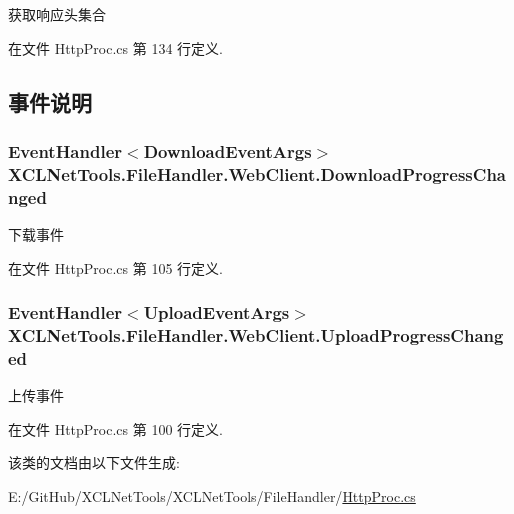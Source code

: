 获取响应头集合 



在文件 Http\+Proc.\+cs 第 134 行定义.



\subsection{事件说明}
\subsubsection[{\texorpdfstring{Download\+Progress\+Changed}{DownloadProgressChanged}}]{\setlength{\rightskip}{0pt plus 5cm}Event\+Handler$<${\bf Download\+Event\+Args}$>$ X\+C\+L\+Net\+Tools.\+File\+Handler.\+Web\+Client.\+Download\+Progress\+Changed}\hypertarget{class_x_c_l_net_tools_1_1_file_handler_1_1_web_client_aa1e50d608381b728356547eff9f80213}{}\label{class_x_c_l_net_tools_1_1_file_handler_1_1_web_client_aa1e50d608381b728356547eff9f80213}


下载事件 



在文件 Http\+Proc.\+cs 第 105 行定义.

\subsubsection[{\texorpdfstring{Upload\+Progress\+Changed}{UploadProgressChanged}}]{\setlength{\rightskip}{0pt plus 5cm}Event\+Handler$<${\bf Upload\+Event\+Args}$>$ X\+C\+L\+Net\+Tools.\+File\+Handler.\+Web\+Client.\+Upload\+Progress\+Changed}\hypertarget{class_x_c_l_net_tools_1_1_file_handler_1_1_web_client_abe950fa329508b4c52e3181aeb97585f}{}\label{class_x_c_l_net_tools_1_1_file_handler_1_1_web_client_abe950fa329508b4c52e3181aeb97585f}


上传事件 



在文件 Http\+Proc.\+cs 第 100 行定义.



该类的文档由以下文件生成\+:\begin{DoxyCompactItemize}
\item 
E\+:/\+Git\+Hub/\+X\+C\+L\+Net\+Tools/\+X\+C\+L\+Net\+Tools/\+File\+Handler/\hyperlink{_http_proc_8cs}{Http\+Proc.\+cs}\end{DoxyCompactItemize}
